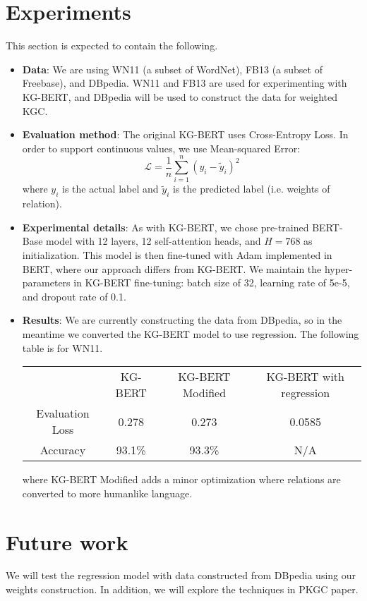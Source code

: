 \documentclass{article}
\begin{document}
\section{Experiments}
This section is expected to contain the following.
\begin{itemize}
\item \textbf{Data}: We are using WN11\cite{10.5555/2999611.2999715} (a subset of WordNet), FB13\cite{10.5555/2999792.2999923} (a subset of Freebase), and DBpedia. WN11 and FB13 are used for experimenting with KG-BERT, and DBpedia will be used to construct the data for weighted KGC.
\item \textbf{Evaluation method}: The original KG-BERT uses Cross-Entropy Loss. In order to support continuous values, we use Mean-squared Error:
  \begin{equation}
    \mathcal{L} = \frac{1}{n} \sum_{i = 1}^n (y_i - \tilde{y}_i)^2
  \end{equation}
  where $y_i$ is the actual label and $\tilde{y}_i$ is the predicted label (i.e. weights of relation).
\item \textbf{Experimental details}: As with KG-BERT, we chose pre-trained BERT-Base model with 12 layers, 12 self-attention heads, and $H = 768$ as initialization. This model is then fine-tuned with Adam implemented in BERT, where our approach differs from KG-BERT. We maintain the hyper-parameters in KG-BERT fine-tuning: batch size of 32, learning rate of 5e-5, and dropout rate of 0.1.

\item \textbf{Results}: We are currently constructing the data from DBpedia, so in the meantime we converted the KG-BERT model to use regression. The following table is for WN11.

  \begin{center}
    \begin{tabular}{ |c|c|c|c| }
      \hline
      & KG-BERT & KG-BERT Modified & KG-BERT with regression \\
      Evaluation Loss & 0.278 & 0.273 & 0.0585 \\
      Accuracy & 93.1\% & 93.3\% & N/A  \\
      \hline
    \end{tabular}
  \end{center}

  where KG-BERT Modified adds a minor optimization where relations are converted to more humanlike language.
\end{itemize}


\section{Future work}
We will test the regression model with data constructed from DBpedia using our weights construction. In addition, we will explore the techniques in PKGC paper\cite{lv-etal-2022-pre}.



\end{document}
